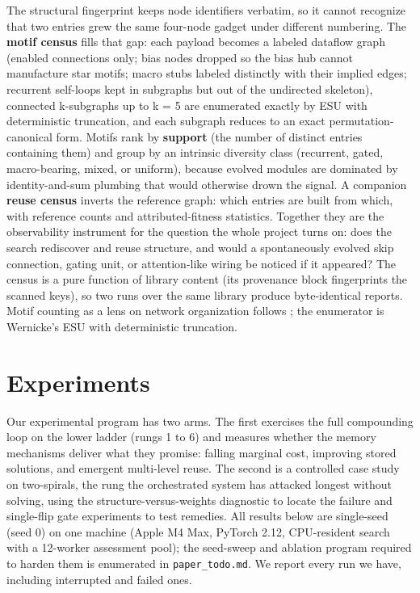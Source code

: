 \documentclass[11pt]{article}
\begin{document}
The structural fingerprint keeps node identifiers verbatim, so it cannot recognize that two entries grew the same four-node gadget under different numbering. The \textbf{motif census} fills that gap: each payload becomes a labeled dataflow graph (enabled connections only; bias nodes dropped so the bias hub cannot manufacture star motifs; macro stubs labeled distinctly with their implied edges; recurrent self-loops kept in subgraphs but out of the undirected skeleton), connected k-subgraphs up to k = 5 are enumerated exactly by ESU with deterministic truncation, and each subgraph reduces to an exact permutation-canonical form. Motifs rank by \textbf{support} (the number of distinct entries containing them) and group by an intrinsic diversity class (recurrent, gated, macro-bearing, mixed, or uniform), because evolved modules are dominated by identity-and-sum plumbing that would otherwise drown the signal. A companion \textbf{reuse census} inverts the reference graph: which entries are built from which, with reference counts and attributed-fitness statistics. Together they are the observability instrument for the question the whole project turns on: does the search rediscover and reuse structure, and would a spontaneously evolved skip connection, gating unit, or attention-like wiring be noticed if it appeared? The census is a pure function of library content (its provenance block fingerprints the scanned keys), so two runs over the same library produce byte-identical reports. Motif counting as a lens on network organization follows \citet{milo2002}; the enumerator is Wernicke's ESU \citep{wernicke2006} with deterministic truncation.

\section{Experiments}

Our experimental program has two arms. The first exercises the full compounding loop on the lower ladder (rungs 1 to 6) and measures whether the memory mechanisms deliver what they promise: falling marginal cost, improving stored solutions, and emergent multi-level reuse. The second is a controlled case study on two-spirals, the rung the orchestrated system has attacked longest without solving, using the structure-versus-weights diagnostic to locate the failure and single-flip gate experiments to test remedies. All results below are single-seed (seed 0) on one machine (Apple M4 Max, PyTorch 2.12, CPU-resident search with a 12-worker assessment pool); the seed-sweep and ablation program required to harden them is enumerated in \texttt{paper_todo.md}. We report every run we have, including interrupted and failed ones.
\end{document}
